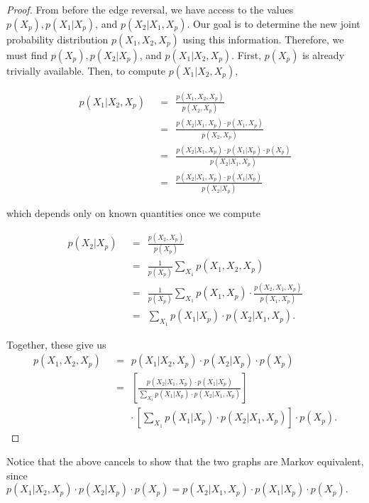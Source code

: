 \begin{proof}
From before the edge reversal, we have access to the values $p(X_{p}), p(X_{1}|X_{p})$, and $p(X_{2}|X_{1},X_{p})$. Our goal is to determine the new joint probability distribution $p(X_{1}, X_{2}, X_{p})$ using this information. Therefore, we must find $p(X_{p}), p(X_{2}|X_{p})$, and $p(X_{1}|X_{2},X_{p})$. First, $p(X_{p})$ is already trivially available. Then, to compute $p(X_{1}|X_{2},X_{p})$,

\begin{align*}
p(X_{1}|X_{2},X_{p}) & \ \ = \ \  \frac{ p(X_{1}, X_{2}, X_{p})  }{ p(X_{2},X_{p})  } \\[1em]
			    & \ \ = \ \  \frac{ p(X_{2}|X_{1},X_{p}) \cdot p(X_{1},X_{p}) }{ p(X_{2},X_{p}) } \\[1em]
			    & \ \ = \ \  \frac{ p(X_{2}|X_{1},X_{p}) \cdot p(X_{1}|X_{p}) \cdot p(X_{p}) }{ p(X_{2}|X_{1},X_{p}) } \\[1em]
			    & \ \ = \ \  \frac{ p(X_{2}|X_{1},X_{p}) \cdot p(X_{1}|X_{p}) }{ p(X_{2}|X_{p}) }
\end{align*}

which depends only on known quantities once we compute

\begin{align*}
p(X_{2}|X_{p}) 	& \ \ = \ \ \frac{p(X_{2},X_{p})}{p(X_{p})} \\[1em]
			& \ \ = \ \ \frac{1}{p(X_{p})} \sum_{X_{1}} p(X_{1},X_{2},X_{p}) \\[1em]
			& \ \ = \ \ \frac{1}{p(X_{p})} \sum_{X_{1}} p(X_{1},X_{p}) \cdot \frac{p(X_{2},X_{1}, X_{p})}{p(X_{1},X_{p})} \\[1em]
			& \ \ = \ \ \sum_{X_{1}} p(X_{1}|X_{p}) \cdot p(X_{2}|X_{1},X_{p}).
\end{align*}

Together, these give us 
\begin{align*}
p(X_{1},X_{2},X_{p})	& \ \ = \ \ p(X_{1}|X_{2},X_{p}) \cdot p(X_{2}|X_{p}) \cdot  p(X_{p}) \\[1em]
				& \ \ = \ \    
				[\frac{   p(X_{2}|X_{1},X_{p}) \cdot p(X_{1}|X_{p})   }{  \sum_{X_{1}} p(X_{1}|X_{p}) \cdot p(X_{2}|X_{1},X_{p})  }  ] \\[1em] 
				&  \quad \quad \cdot [\sum_{X_{1}} p(X_{1}|X_{p})\cdot p(X_{2}|X_{1},X_{p})] \cdot p(X_{p}).
\end{align*}
\end{proof}

\begin{remark}
Notice that the above cancels to show that the two graphs are Markov equivalent, since $p(X_{1}|X_{2},X_{p}) \cdot p(X_{2}|X_{p}) \cdot p(X_{p})=  p(X_{2}|X_{1},X_{p}) \cdot p(X_{1}|X_{p}) \cdot p(X_{p}).$
\end{remark}

